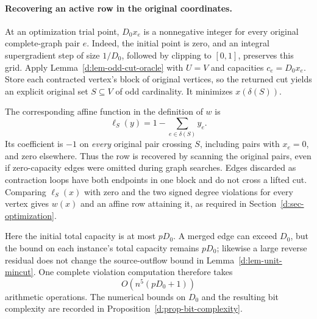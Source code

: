 

\paragraph{Recovering an active row in the original coordinates.}
At an optimization trial point, \(D_0x_e\) is a nonnegative integer
for every original complete-graph pair \(e\).
Indeed, the initial point is zero, and an integral supergradient step
of size \(1/D_0\), followed by clipping to \([0,1]\), preserves this grid.
Apply Lemma~\ref{d:lem-odd-cut-oracle} with \(U=V\) and capacities
\(c_e=D_0x_e\).  Store each contracted vertex's block of original
vertices, so the returned cut yields an explicit original set
\(S\subseteq V\) of odd cardinality.  It minimizes \(x(\delta(S))\).

The corresponding affine function in the definition of \(w\) is
\[
 \ell_S(y)=1-\sum_{e\in\delta(S)}y_e.
\]
Its coefficient is \(-1\) on \emph{every} original pair crossing \(S\),
including pairs with \(x_e=0\), and zero elsewhere.
Thus the row is recovered by scanning the original pairs, even if
zero-capacity edges were omitted during graph searches.
Edges discarded as contraction loops have both endpoints in one
block and do not cross a lifted cut.
Comparing \(\ell_S(x)\) with zero and the two signed degree violations
for every vertex gives \(w(x)\) and an affine row attaining it, as
required in Section~\ref{d:sec-optimization}.

Here the initial total capacity is at most \(pD_0\).
A merged edge can exceed \(D_0\), but the bound on each instance's
total capacity remains \(pD_0\); likewise a large reverse residual
does not change the source-outflow bound in Lemma~\ref{d:lem-unit-mincut}.
One complete violation computation therefore takes
\[
 O\!\left(n^5(pD_0+1)\right)
\]
arithmetic operations.
The numerical bounds on \(D_0\) and the resulting bit complexity
are recorded in Proposition~\ref{d:prop-bit-complexity}.
